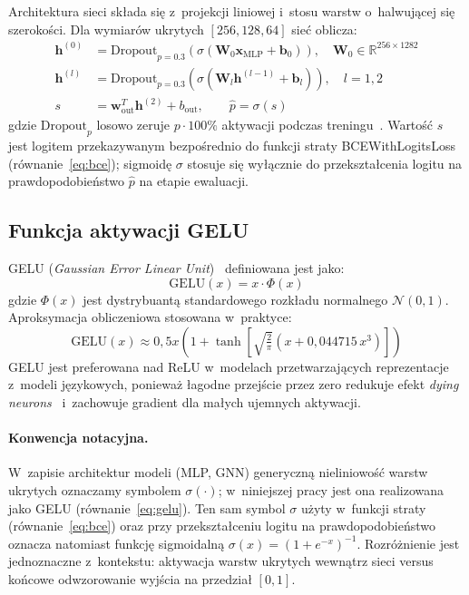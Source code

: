 \documentclass{SGGW-thesis}
\begin{document}
Architektura sieci składa się z~projekcji liniowej i~stosu warstw o~halwującej się szerokości.
Dla wymiarów ukrytych $[256, 128, 64]$ sieć oblicza:
\begin{align}
    \mathbf{h}^{(0)} &= \mathrm{Dropout}_{p=0.3}\!\left(\sigma\!\left(\mathbf{W}_0 \mathbf{x}_{\mathrm{MLP}} + \mathbf{b}_0\right)\right), \quad \mathbf{W}_0 \in \mathbb{R}^{256 \times 1282} \label{eq:mlp0} \\
    \mathbf{h}^{(l)} &= \mathrm{Dropout}_{p=0.3}\!\left(\sigma\!\left(\mathbf{W}_l \mathbf{h}^{(l-1)} + \mathbf{b}_l\right)\right), \quad l = 1, 2 \label{eq:mlpl} \\
    s          &= \mathbf{w}_{\mathrm{out}}^T \mathbf{h}^{(2)} + b_{\mathrm{out}}, \qquad \hat{p} = \sigma(s) \label{eq:mlpout}
\end{align}
gdzie $\mathrm{Dropout}_{p}$ losowo zeruje $p \cdot 100\%$ aktywacji podczas treningu~\cite{srivastava2014}.
Wartość $s$ jest logitem przekazywanym bezpośrednio do funkcji straty
BCEWithLogitsLoss (równanie~\eqref{eq:bce}); sigmoidę $\sigma$ stosuje się wyłącznie do
przekształcenia logitu na prawdopodobieństwo $\hat{p}$ na etapie ewaluacji.

\subsection{Funkcja aktywacji GELU}

GELU (\textit{Gaussian Error Linear Unit})~\cite{hendrycks2016} definiowana jest jako:
\begin{equation}
    \mathrm{GELU}(x) = x \cdot \Phi(x)
    \label{eq:gelu}
\end{equation}
gdzie $\Phi(x)$ jest dystrybuantą standardowego rozkładu normalnego $\mathcal{N}(0,1)$.
Aproksymacja obliczeniowa stosowana w~praktyce:
\begin{equation}
    \mathrm{GELU}(x) \approx 0{,}5x\!\left(1 + \tanh\!\left[\sqrt{\tfrac{2}{\pi}}\!\left(x + 0{,}044715\,x^3\right)\right]\right)
    \label{eq:gelu_approx}
\end{equation}
GELU jest preferowana nad ReLU w~modelach przetwarzających reprezentacje z~modeli językowych,
ponieważ łagodne przejście przez zero redukuje efekt \textit{dying neurons}~\cite{hendrycks2016} i~zachowuje gradient
dla małych ujemnych aktywacji.

\paragraph{Konwencja notacyjna.} W~zapisie architektur modeli (MLP, GNN) generyczną nieliniowość
warstw ukrytych oznaczamy symbolem $\sigma(\cdot)$; w~niniejszej pracy jest ona realizowana jako
GELU (równanie~\eqref{eq:gelu}). Ten sam symbol $\sigma$ użyty w~funkcji straty
(równanie~\eqref{eq:bce}) oraz przy przekształceniu logitu na prawdopodobieństwo oznacza natomiast
funkcję sigmoidalną $\sigma(x) = (1+e^{-x})^{-1}$. Rozróżnienie jest jednoznaczne z~kontekstu:
aktywacja warstw ukrytych wewnątrz sieci versus końcowe odwzorowanie wyjścia na przedział $[0,1]$.
\end{document}
